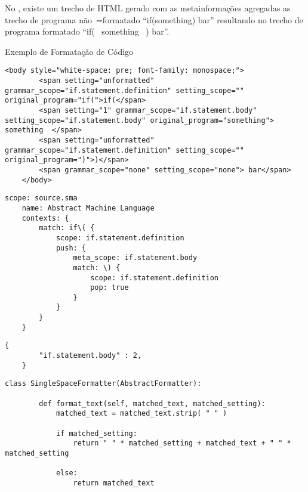No ,
existe um trecho de HTML gerado com as metainformações agregadas as trecho de programa não~=formatado ``if(something) bar'' resultando no trecho de programa formatado ``if( \ something \ ) bar''.
\begin{quadro}[h]
\caption{Exemplo de Formatação de Código}
\label{exemploDeFormatacaoDeCodigo}
\begin{bluebox}
\lstset{xleftmargin=2em,aboveskip=0pt}

    \begin{lstlisting}[caption={Exemplo de HTML Gerado pelo Formatador de Código},label={exemploDeHTMLGerado},style=HTML5]
    <body style="white-space: pre; font-family: monospace;">
        <span setting="unformatted" grammar_scope="if.statement.definition" setting_scope="" original_program="if(">if(</span>
        <span setting="1" grammar_scope="if.statement.body" setting_scope="if.statement.body" original_program="something">  something  </span>
        <span setting="unformatted" grammar_scope="if.statement.definition" setting_scope="" original_program=")">)</span>
        <span grammar_scope="none" setting_scope="none"> bar</span>
    </body>
    \end{lstlisting}
    \begin{lstlisting}[caption={Exemplo de Gramática Utilizada pelo Formatador de Código},label={exemploDeGramaticaUtilizada},style=yaml_style]
    scope: source.sma
    name: Abstract Machine Language
    contexts: {
        match: if\( {
            scope: if.statement.definition
            push: {
                meta_scope: if.statement.body
                match: \) {
                    scope: if.statement.definition
                    pop: true
                }
            }
        }
    }
    \end{lstlisting}
    \begin{lstlisting}[caption={Exemplo de Configuração Utilizada pelo Formatador de Código},label={exemploDeConfiguracaoUtilizada},style=python_style]
    {
        "if.statement.body" : 2,
    }
    \end{lstlisting}
    \begin{lstlisting}[caption={Exemplo de Formatador de Código},label={exemploDeFormatadorDeCodigo},style=python_style]
    class SingleSpaceFormatter(AbstractFormatter):

        def format_text(self, matched_text, matched_setting):
            matched_text = matched_text.strip( " " )

            if matched_setting:
                return " " * matched_setting + matched_text + " " * matched_setting

            else:
                return matched_text
    \end{lstlisting}
\end{bluebox}
\end{quadro}

